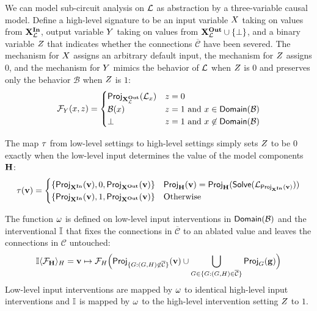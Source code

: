 \documentclass[twoside,11pt]{article}
\begin{document}
We can model sub-circuit analysis on $\mathcal{L}$ as abstraction by a three-variable causal model. Define a high-level signature to be an input variable $X$ taking on values from $\mathbf{X}^{\mathbf{In}}_{\mathcal{L}}$, output variable $Y$ taking on values from $\mathbf{X}^{\mathbf{Out}}_{\mathcal{L}} \cup \{\bot\}$, and a binary variable $Z$ that indicates whether the connections $\overline{\mathcal{C}}$ have been severed. The mechanism for $X$ assigns an arbitrary default input, the mechanism for $Z$ assigns $0$, and the mechanism for $Y$ mimics the behavior of $\mathcal{L}$ when $Z$ is $0$ and preserves only the behavior $\mathcal{B}$ when $Z$ is $1$:
\[ \mathcal{F}_{Y}(x, z) = \begin{cases}
\mathsf{Proj}_{\mathbf{X}^{\mathbf{Out}}_{\mathcal{L}}}(\mathcal{L}_{x}) & z = 0\\
\mathcal{B}(x) & z = 1 \text{ and } x \in \mathsf{Domain}(\mathcal{B})\\
\bot& z = 1 \text{ and } x \not \in \mathsf{Domain}(\mathcal{B})\\
\end{cases}\]

The map $\tau$ from low-level settings to  high-level settings simply sets $Z$ to be $0$ exactly when the low-level input determines the value of the model components $\mathbf{H}$:
\[\tau(\mathbf{v}) = \begin{cases} 
\{\mathsf{Proj}_{\mathbf{X}^{\mathbf{In}}}(\mathbf{v}), 0,\mathsf{Proj}_{\mathbf{X}^{\mathbf{Out}}}(\mathbf{v}) \} &  \mathsf{Proj}_{\mathbf{H}}(\mathbf{v}) = \mathsf{Proj}_{ \mathbf{H}}(\mathsf{Solve}(\mathcal{L}_{\mathsf{Proj}_{\mathbf{X}^{\mathbf{In}}}(\mathbf{v})})) \\ 
\{\mathsf{Proj}_{\mathbf{X}^{\mathbf{In}}}(\mathbf{v}), 1,\mathsf{Proj}_{\mathbf{X}^{\mathbf{Out}}}(\mathbf{v}) \} & \text{Otherwise} \\
\end{cases}\]

The function $\omega$  is defined on low-level input interventions in $\mathsf{Domain}(\mathcal{B})$ and the interventional $\mathbb{I}$ that fixes the connections in $\overline{\mathcal{C}}$ to an ablated value and leaves the connections in $\mathcal{C}$ untouched:
\[\mathbb{I}\langle\mathcal{F}_{\mathbf{H}}\rangle_{H} =\mathbf{v} \mapsto \mathcal{F}_{H}\Big( 
\mathsf{Proj}_{\{G: (G, H) \not \in \overline{\mathcal{C}}\}}(\mathbf{v}) \cup \bigcup_{G \in \{G: (G, H) \in \overline{\mathcal{C}}\}}\mathsf{Proj}_{G}(\mathbf{g})  \Big)\]
Low-level input interventions are mapped by $\omega$ to identical high-level input interventions and $\mathbb{I}$ is mapped by $\omega$ to the high-level intervention setting $Z$ to $1$.
\end{document}
